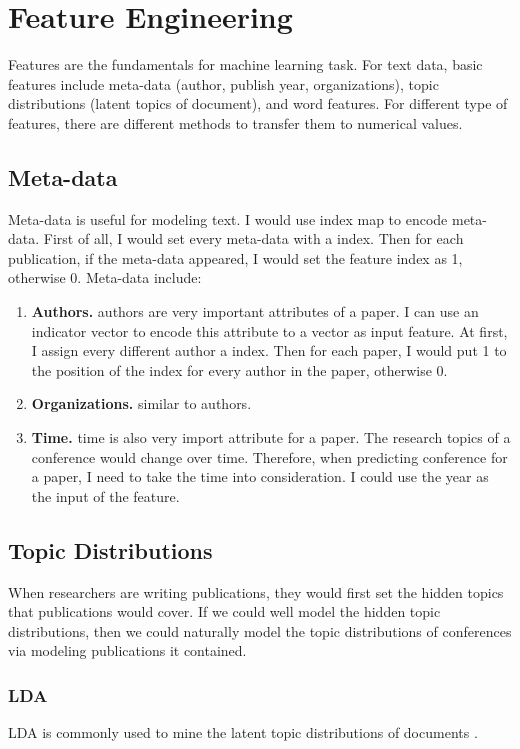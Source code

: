 \section{Feature Engineering}
Features are the fundamentals for machine learning task. For text data, basic
features include meta-data (author, publish year, organizations), topic
distributions (latent topics of document), and word features. For different type
of features, there are different methods to transfer them to numerical values.

\subsection{Meta-data}
Meta-data is useful for modeling text. I would use index map to encode
meta-data. First of all, I would set every meta-data with a index. Then for each
publication, if the meta-data appeared, I would set the feature index as 1,
otherwise 0. Meta-data include:

\begin{enumerate}[a]
\item \textbf{Authors.} authors are very important attributes of a
paper. I can use an indicator vector to encode this attribute to a vector as
input feature. At first, I assign every different author a index. Then for each
paper, I would put 1 to the position of the index for every author in the paper,
otherwise 0.

\item \textbf{Organizations.} similar to authors.

\item \textbf{Time.} time is also very import attribute for a paper. The research
topics of a conference would change over time. Therefore, when predicting
conference for a paper, I need to take the time into consideration. I could use
the year as the input of the feature.
\end{enumerate}

\subsection{Topic Distributions}
When researchers are writing publications, they would first set the hidden topics
that publications would cover. If we could well model the hidden topic
distributions, then we could naturally model the topic distributions of
conferences via modeling publications it contained.

\subsubsection{LDA}
LDA is commonly used to mine the latent topic distributions
of documents \cite{blei2003latent} \cite{griffiths2004finding}.

